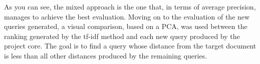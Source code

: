 As you can see, the mixed approach is the one that, in terms of average precision, manages to achieve the best evaluation.
Moving on to the evaluation of the new queries generated, a visual comparison, based on a PCA, was used between the ranking generated by the tf-idf method and each new query produced by the project core. The goal is to find a query whose distance from the target document is less than all other distances produced by the remaining queries.